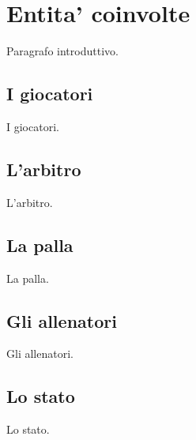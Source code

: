 
\section*{Entita' coinvolte}
%
\label{sec:entita_coinvolte}

Paragrafo introduttivo.

\subsection*{I giocatori}
%
\label{sec:entita_giocatori}

I giocatori.

\subsection*{L'arbitro}
%
\label{sec:entita_abitro}

L'arbitro.

\subsection*{La palla}
%
\label{sec:entita_palla}

La palla.

\subsection*{Gli allenatori}
%
\label{sec:entita_allenatori}

Gli allenatori.

\subsection*{Lo stato}
%
\label{sec:entita_stato}

Lo stato.